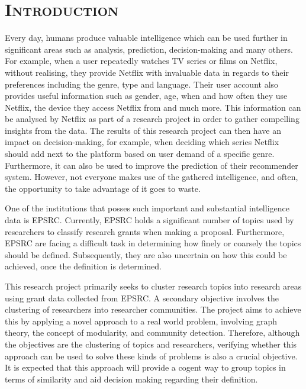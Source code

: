 \chapter{\textsc{Introduction}}
\label{chapter:introduction}

Every day, humans produce valuable intelligence which can be used further in significant areas such as analysis, prediction, decision-making and many others. For example, when a user repeatedly watches TV series or films on Netflix, without realising, they provide Netflix with invaluable data in regards to their preferences including the genre, type and language. Their user account also provides useful information such as gender, age, when and how often they use Netflix, the device they access Netflix from and much more. This information can be analysed by Netflix as part of a research project in order to gather compelling insights from the data. The results of this research project can then have an impact on decision-making, for example, when deciding which series Netflix should add next to the platform based on user demand of a specific genre. Furthermore, it can also be used to improve the prediction of their recommender system. However, not everyone makes use of the gathered intelligence, and often, the opportunity to take advantage of it goes to waste.

One of the institutions that posses such important and substantial intelligence data is EPSRC. Currently, EPSRC holds a significant number of topics used by researchers to classify research grants when making a proposal. Furthermore, EPSRC are facing a difficult task in determining how finely or coarsely the topics should be defined. Subsequently, they are also uncertain on how this could be achieved, once the definition is determined.

This research project primarily seeks to cluster research topics into research areas using grant data collected from EPSRC. A secondary objective involves the clustering of researchers into researcher communities. The project aims to achieve this by applying a novel approach to a real world problem, involving graph theory, the concept of modularity, and community detection. Therefore, although the objectives are the clustering of topics and researchers, verifying whether this approach can be used to solve these kinds of problems is also a crucial objective. It is expected that this approach will provide a cogent way to group topics in terms of similarity and aid decision making regarding their definition.


